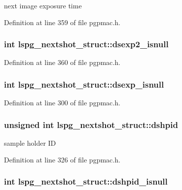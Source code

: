 next image exposure time 



Definition at line 359 of file pgpmac.\-h.

\hypertarget{structlspg__nextshot__struct_a45091283dc073e5b7da2cfbe5a75fade}{
\subsubsection[{dsexp2\-\_\-isnull}]{\setlength{\rightskip}{0pt plus 5cm}int lspg\-\_\-nextshot\-\_\-struct\-::dsexp2\-\_\-isnull}}\label{structlspg__nextshot__struct_a45091283dc073e5b7da2cfbe5a75fade}


Definition at line 360 of file pgpmac.\-h.

\hypertarget{structlspg__nextshot__struct_ae07498f62ea9c0e2f702b78c87500794}{
\subsubsection[{dsexp\-\_\-isnull}]{\setlength{\rightskip}{0pt plus 5cm}int lspg\-\_\-nextshot\-\_\-struct\-::dsexp\-\_\-isnull}}\label{structlspg__nextshot__struct_ae07498f62ea9c0e2f702b78c87500794}


Definition at line 300 of file pgpmac.\-h.

\hypertarget{structlspg__nextshot__struct_a5e260a420176f2973cdb100d0a5c4c09}{
\subsubsection[{dshpid}]{\setlength{\rightskip}{0pt plus 5cm}unsigned int lspg\-\_\-nextshot\-\_\-struct\-::dshpid}}\label{structlspg__nextshot__struct_a5e260a420176f2973cdb100d0a5c4c09}


sample holder I\-D 



Definition at line 326 of file pgpmac.\-h.

\hypertarget{structlspg__nextshot__struct_afe16be0382423aa3f25cb3d6cf99430b}{
\subsubsection[{dshpid\-\_\-isnull}]{\setlength{\rightskip}{0pt plus 5cm}int lspg\-\_\-nextshot\-\_\-struct\-::dshpid\-\_\-isnull}}\label{structlspg__nextshot__struct_afe16be0382423aa3f25cb3d6cf99430b}


